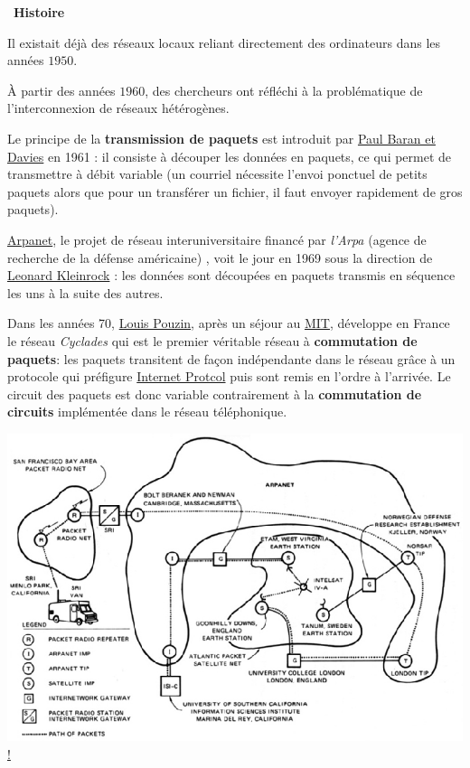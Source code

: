\documentclass[
  11pt,
]{article}
\newcounter{histo}
\newenvironment{histoire}[1]
{\par \medskip   \addtocounter{histo}{1} \noindent  
 \begin {bclogo}[couleur = blue!10 , arrondi =0.1,logo=\bchorloge, marge=4] {~\textbf{Histoire} \textbf{\thehisto} {\itshape #1} }  \par}
{
\end{bclogo}
 \par \bigskip }
\begin{document}
\begin{histoire}{}

Il existait déjà des réseaux locaux reliant directement des ordinateurs
dans les années \(1950\).

À partir des années \(1960\), des chercheurs ont réfléchi à la
problématique de l'interconnexion de réseaux hétérogènes.

Le principe de la \textbf{transmission de paquets} est introduit par
\href{https://fr.wikipedia.org/wiki/Paul_Baran}{Paul Baran et Davies} en
1961 : il consiste à découper les données en paquets, ce qui permet de
transmettre à débit variable (un courriel nécessite l'envoi ponctuel de
petits paquets alors que pour un transférer un fichier, il faut envoyer
rapidement de gros paquets).

\href{https://interstices.info/une-breve-histoire-des-reseaux-de-telecommunications/}{Arpanet},
le projet de réseau interuniversitaire financé par \emph{l'Arpa} (agence
de recherche de la défense américaine) , voit le jour en 1969 sous la
direction de
\href{https://fr.wikipedia.org/wiki/Leonard_Kleinrock}{Leonard
Kleinrock} : les données sont découpées en paquets transmis en séquence
les uns à la suite des autres.

Dans les années 70,
\href{https://interstices.info/louis-pouzin-la-tete-dans-les-reseaux/}{Louis
Pouzin}, après un séjour au \href{http://www.mit.edu/}{MIT}, développe
en France le réseau \emph{Cyclades} qui est le premier véritable réseau
à \textbf{commutation de paquets}: les paquets transitent de façon
indépendante dans le réseau grâce à un protocole qui préfigure
\href{}{Internet Protcol} puis sont remis en l'ordre à l'arrivée. Le
circuit des paquets est donc variable contrairement à la
\textbf{commutation de circuits} implémentée dans le réseau
téléphonique.

\href{https://interstices.info/une-breve-histoire-des-reseaux-de-telecommunications/}{\includegraphics{images/internet-1977.jpg}!}


\end{histoire}
\end{document}
